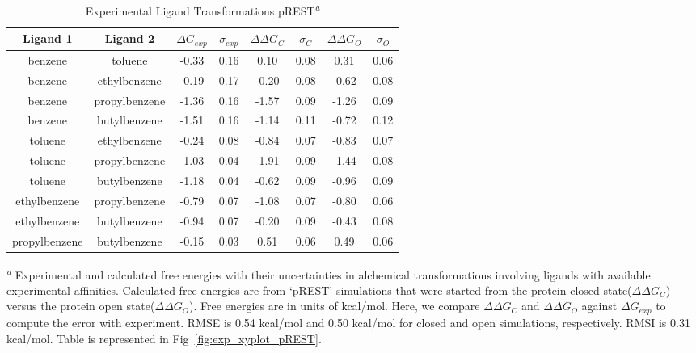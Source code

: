 \begin{table}[!htb]
\centering
\caption{Experimental Ligand Transformations pREST\textsuperscript{\emph{a}}}
\label{tbl:exp_pREST_set}
\begin{tabular}{|c|c|c|c|c|c|c|c|}
\hline
\textbf{Ligand 1} & \textbf{Ligand 2} & \boldmath$\Delta G_{exp}$  & \boldmath$\sigma_{exp}$ & \boldmath$\Delta\Delta G_{C}$ & \boldmath$\sigma_{C}$ & \boldmath$\Delta\Delta G_{O}$ & \boldmath$\sigma_{O}$ \\ \hline
benzene         & toluene         & -0.33 & 0.16  & 0.10  & 0.08  & 0.31  & 0.06          \\ \hline
benzene         & ethylbenzene    &-0.19  & 0.17  & -0.20 & 0.08  & -0.62 & 0.08          \\ \hline
benzene         & propylbenzene & -1.36 & 0.16  & -1.57 & 0.09  & -1.26 & 0.09         \\ \hline
benzene         & butylbenzene  & -1.51 & 0.16  & -1.14 & 0.11  & -0.72 & 0.12         \\ \hline
toluene         & ethylbenzene    & -0.24 & 0.08  & -0.84 & 0.07  & -0.83 & 0.07          \\ \hline
toluene         & propylbenzene & -1.03 & 0.04  & -1.91 & 0.09  & -1.44 & 0.08          \\ \hline
toluene         & butylbenzene  & -1.18 & 0.04  & -0.62 & 0.09  & -0.96 & 0.09          \\ \hline
ethylbenzene    & propylbenzene & -0.79 & 0.07  & -1.08 & 0.07  & -0.80 & 0.06         \\ \hline
ethylbenzene    & butylbenzene  & -0.94 & 0.07  & -0.20 & 0.09  & -0.43 & 0.08         \\ \hline
propylbenzene & butylbenzene  & -0.15 & 0.03  & 0.51  & 0.06  & 0.49  & 0.06       \\ \hline
\end{tabular}

\textsuperscript{\emph{a}} Experimental and calculated free energies with their uncertainties in alchemical transformations involving ligands with available experimental affinities.
Calculated free energies are from `pREST' simulations that were started from the protein closed state(\boldmath$\Delta\Delta G_{C}$) versus the protein open state(\boldmath$\Delta\Delta G_{O}$). 
Free energies are in units of kcal/mol.
Here, we compare \boldmath$\Delta\Delta G_{C}$ and \boldmath$\Delta\Delta G_{O}$ against \boldmath$\Delta G_{exp}$ to compute the error with experiment.
RMSE is 0.54 kcal/mol and 0.50 kcal/mol for closed and open simulations, respectively.
RMSI is 0.31 kcal/mol.
Table is represented in Fig~\ref{fig:exp_xyplot_pREST}.
\end{table}
